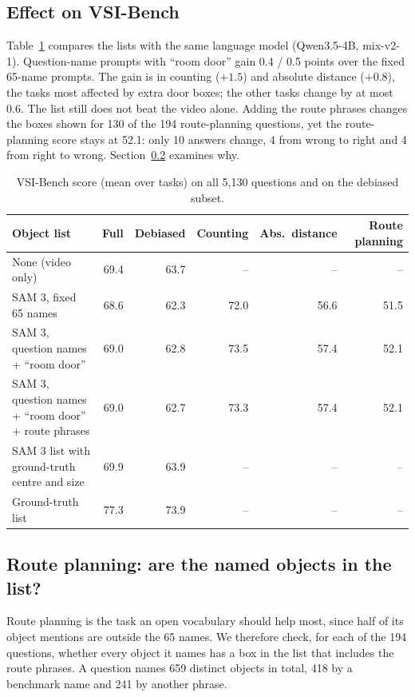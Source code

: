 \subsection{Effect on VSI-Bench}

Table~\ref{tab:sam3-vsi} compares the lists with the same language model (Qwen3.5-4B, mix-v2-1).
Question-name prompts with ``room door'' gain 0.4 / 0.5 points over the fixed 65-name prompts. The gain is in
counting ($+1.5$) and absolute distance ($+0.8$), the tasks most affected by extra door boxes; the other tasks
change by at most 0.6. The list still does not beat the video alone.
Adding the route phrases changes the boxes shown for 130 of the 194 route-planning questions, yet the
route-planning score stays at 52.1: only 10 answers change, 4 from wrong to right and 4 from right to wrong.
Section~\ref{sec:sam3-route} examines why.

\begin{table}[t]
\centering
\caption{VSI-Bench score (mean over tasks) on all 5,130 questions and on the debiased subset.}
\label{tab:sam3-vsi}
\begin{tabular}{lrrrrr}
\toprule
Object list & Full & Debiased & Counting & Abs.\ distance & Route planning \\
\midrule
None (video only)                               & 69.4 & 63.7 & -- & -- & -- \\
SAM 3, fixed 65 names                           & 68.6 & 62.3 & 72.0 & 56.6 & 51.5 \\
SAM 3, question names + ``room door''           & 69.0 & 62.8 & 73.5 & 57.4 & 52.1 \\
SAM 3, question names + ``room door'' + route phrases & 69.0 & 62.7 & 73.3 & 57.4 & 52.1 \\
SAM 3 list with ground-truth centre and size    & 69.9 & 63.9 & -- & -- & -- \\
Ground-truth list                               & 77.3 & 73.9 & -- & -- & -- \\
\bottomrule
\end{tabular}
\end{table}

\subsection{Route planning: are the named objects in the list?}
\label{sec:sam3-route}

Route planning is the task an open vocabulary should help most, since half of its object mentions are outside
the 65 names. We therefore check, for each of the 194 questions, whether every object it names has a box in
the list that includes the route phrases. A question names 659 distinct objects in total, 418 by a benchmark
name and 241 by another phrase.


